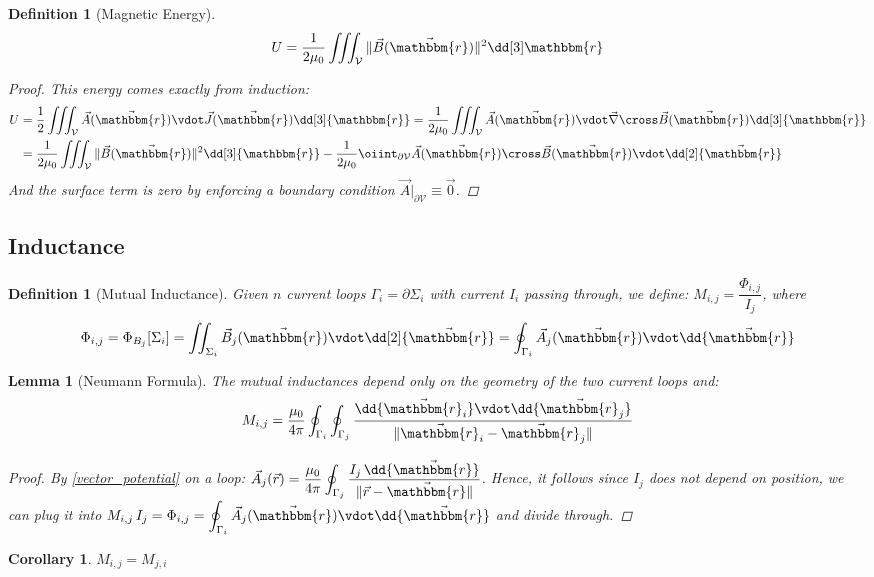 \documentclass[12pt]{article}
\renewcommand{\curl}{\vec{\nabla}\cross}
\newcommand*{\rv}{\vec{r}}
\newcommand*{\ir}{\mathbbm{r}}
\newcommand*{\irv}{\vec{\mathbbm{r}}}
\newcommand*{\vB}{\vec{B}}
\newcommand*{\vJ}{\vec{J}}
\newcommand*{\vA}{\vec{A}}
\newcommand*{\mmu}{\mu_0}
\newcommand*{\vol}{\mathcal{V}}
\newtheorem{definition}[theorem]{Definition}
\newtheorem{lemma}[theorem]{Lemma}
\newtheorem{corollary}[theorem]{Corollary}
\begin{document}
\begin{definition}[Magnetic Energy]
  \label{energy_mag}
  $$U=\frac{1}{2\mmu}\iiint_\vol \|\vB(\irv)\|^2\dd[3]\ir$$
  \begin{proof}
    This energy comes exactly from induction: 
    \begin{align*}
      U&=\frac{1}{2}\iiint_\vol \vA(\irv)\vdot\vJ(\irv)\dd[3]{\ir}=\frac{1}{2\mu_0}\iiint_\vol \vA(\irv)\vdot\curl\vB(\irv)\dd[3]{\ir}\\
      &=\frac{1}{2\mu_0}\iiint_\vol \|\vB(\irv)\|^2\dd[3]{\ir}-\frac{1}{2\mu_0}\oiint_{\partial\vol} \vA(\irv)\cross\vB(\irv)\vdot\dd[2]{\irv}
    \end{align*}
    And the surface term is zero by enforcing a boundary condition $\vA\big|_{\partial\vol}\equiv\vec{0}$.
  \end{proof}
\end{definition}

\pagebreak

\subsection{Inductance}

\begin{definition}[Mutual Inductance]
  Given $n$ current loops $\Gamma_i=\partial\Sigma_i$ with current $I_i$ passing through, we define: $M_{i,j}=\dfrac{\Phi_{i,j}}{I_j}$, where $$\Phi_{i,j}=\Phi_{B_j}[\Sigma_i]=\iint_{\Sigma_i}\vB_j(\irv)\vdot\dd[2]{\irv}=\oint_{\Gamma_i}\vA_j(\irv)\vdot\dd{\irv}$$
\end{definition}

\begin{lemma}[Neumann Formula]
  The mutual inductances depend only on the geometry of the two current loops and: $$M_{i,j}=\frac{\mmu}{4\pi}\oint_{\Gamma_i}\oint_{\Gamma_j}\frac{\dd{\irv_i}\vdot\dd{\irv_j}}{\|\irv_i-\irv_j\|}$$
  \begin{proof}
    By \ref{vector_potential} on a loop: $\displaystyle\vA_j(\rv)=\frac{\mmu}{4\pi}\oint_{\Gamma_j}\frac{I_j\,\dd{\irv}}{\|\rv-\irv\|}$. Hence, it follows since $I_j$ does not depend on position, we can plug it into $\displaystyle M_{i,j}\, I_j=\Phi_{i,j}=\oint_{\Gamma_i}\vA_j(\irv)\vdot\dd{\irv}$ and divide through.
  \end{proof}
\end{lemma}

\begin{corollary}
  $M_{i,j}=M_{j,i}$
\end{corollary}
\end{document}
